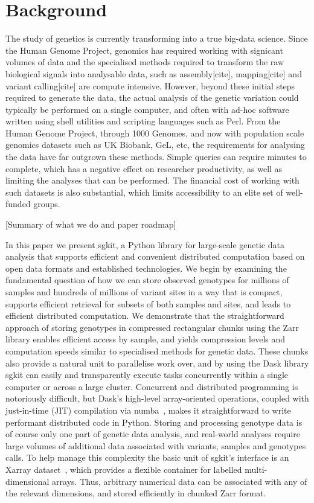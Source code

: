 \documentclass[a4paper,num-refs]{oup-contemporary}
\begin{document}
\section{Background}
The study of genetics is currently transforming into a true big-data science.
Since the Human Genome Project, genomics has required working with
signicant volumes of data and the specialised methods
required to transform the raw biological signals into analysable data,
such as assembly[cite], mapping[cite] and variant calling[cite] are compute intensive.
However, beyond these initial steps required to generate the data, the actual
analysis of the genetic variation could typically be performed on a single
computer, and often with ad-hoc software written using shell utilities
and scripting languages such as Perl.
From the Human Genome Project, through 1000 Genomes, and now with
population scale genomics datasets such as UK Biobank, GeL, etc,
the requirements for analysing the data have far outgrown these
methods. Simple queries can require minutes to complete, which
has a negative effect on researcher productivity, as well as limiting
the analyses that can be performed. The financial cost of working
with such datasets is also substantial, which limits accessibility
to an elite set of well-funded groups.

[Summary of what we do and paper roadmap]

In this paper we present sgkit, a Python library for large-scale genetic data
analysis that supports efficient and convenient distributed computation based
on open data formats and established technologies. We begin by examining the
fundamental question of how we can store observed genotypes for millions of
samples and hundreds of millions of variant sites in a way that is compact,
supports efficient retrieval for subsets of both samples and sites, and leads
to efficient distributed computation. We demonstrate that the straightforward
approach of storing genotypes in compressed rectangular chunks using the Zarr
library enables efficient access by sample, and yields compression levels and
computation speeds similar to specialised methods for genetic data. These
chunks also provide
a natural unit %
to parallelise work over, and by using the Dask library sgkit can easily and
transparently execute tasks concurrently within a single computer or across a
large cluster. Concurrent and distributed programming is notoriously difficult,
but Dask's high-level array-oriented operations, coupled with just-in-time
(JIT) compilation via numba~\citep{lam2015numba}, makes it straightforward to
write performant distributed code in Python.
Storing and processing genotype data is of course only one part of
genetic data analysis, and real-world analyses require large volumes
of additional data associated with variants, samples and genotypes calls.
To help manage this complexity
the basic unit of sgkit's interface is an Xarray
dataset~\citep{hoyer2017xarray}, which provides a flexible container
for labelled multi-dimensional arrays. Thus, arbitrary numerical data
can be associated with any of the relevant dimensions, and stored
efficiently in chunked Zarr format.
\end{document}
